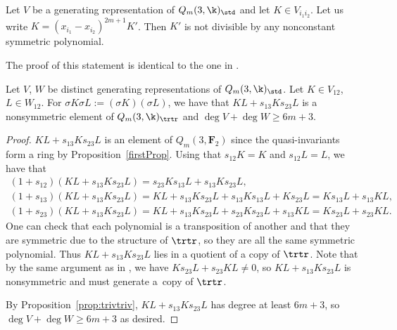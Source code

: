 \begin{Corollary}
 Let $V$ be a generating representation of $Q_m(3,\k)_\std$ and let $K\in V_{i_1i_2}$. Let us write $K=(x_{i_1}-x_{i_2})^{2m+1}K'$. Then $K'$ is not divisible by any nonconstant symmetric polynomial.
\end{Corollary}

The proof of this statement is identical to the one in \cite{wang2022explicit}.

\begin{Lemma}\label{char3.4}
 Let $V$, $W$ be distinct generating representations of $Q_m(3,\k)_\std$. Let ${K\in V_{12}}$, ${L\in W_{12}}$. For $\sigma K\sigma L:=(\sigma K)(\sigma L)$, we have that $KL+s_{13}Ks_{23}L$ is a nonsymmetric element of $Q_m(3,\k)_\trtr$ and $\deg V+\deg W\geq 6m+3$.
\end{Lemma}
\begin{proof}
 $KL+s_{13}Ks_{23}L$ is an element of $Q_m(3,\mathbf{F}_2)$ since the quasi-invariants form a ring by Proposition~\ref{firstProp}. Using that $s_{12}K=K$ and $s_{12}L=L$, we have that
 \begin{gather*}
 (1+s_{12})(KL+s_{13}Ks_{23}L) = s_{23}Ks_{13}L+s_{13}Ks_{23}L,\\
 (1+s_{13})(KL+s_{13}Ks_{23}L) = KL+s_{13}Ks_{23}L+s_{13}Ks_{13}L + Ks_{23}L = Ks_{13}L+s_{13}KL,\\
 (1+s_{23})(KL+s_{13}Ks_{23}L) = KL+s_{13}Ks_{23}L+s_{23}Ks_{23}L + s_{13}KL = Ks_{23}L+s_{23}KL.
 \end{gather*}
 One can check that each polynomial is a transposition of another and that they are symmetric due to the structure of $\trtr$, so they are all the same symmetric polynomial. Thus ${KL+s_{13}Ks_{23}L}$ lies in a quotient of a copy of $\trtr$. Note that by the same argument as in \cite{wang2022explicit}, we have $Ks_{23}L+s_{23}KL\neq 0$, so $KL+s_{13}Ks_{23}L$ is nonsymmetric and must generate a~copy of $\trtr$.

 By Proposition~\ref{prop:trivtriv}, $KL+s_{13}Ks_{23}L$ has degree at least $6m+3$, so $\deg V+\deg W\geq 6m+3$ as desired.
\end{proof}

